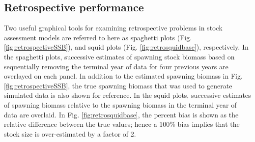 


\subsection*{Retrospective performance} %
\label{sub:retrospective_performance}

Two useful graphical tools for examining retrospective problems in stock assessment models are referred to here as spaghetti plots (Fig. \ref{fig:retrospectiveSSB}), and squid plots (Fig. \ref{fig:retrosquidbase}), respectively.  In the spaghetti plots, successive estimates of spawning stock biomass based on sequentially removing the terminal year of data for four previous years are overlayed on each panel.  In addition to the estimated spawning biomass in Fig. \ref{fig:retrospectiveSSB}, the true spawning biomass that was used to generate simulated data is also shown for reference.  In the squid plots, successive estimates of spawning biomass relative to the  spawning biomass in the terminal year of data are overlaid.  In Fig. \ref{fig:retrosquidbase}, the percent bias is shown as the relative difference between the true values; hence a 100\% bias implies that the stock size is over-estimated by a factor of 2.  



